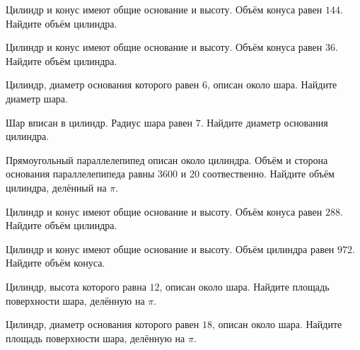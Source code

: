 \documentclass[4apaper]{article}
\begin{document}
\begin{taskBN}{9}
Цилиндр и конус имеют общие основание и высоту. Объём конуса равен $144$. Найдите объём цилиндра.
\end{taskBN}

\begin{taskBN}{10}
Цилиндр и конус имеют общие основание и высоту. Объём конуса равен $36$. Найдите объём цилиндра.
\end{taskBN}

\begin{taskBN}{11}
 Цилиндр, диаметр основания которого равен $6$, описан около шара. Найдите диаметр шара.
\end{taskBN}

\begin{taskBN}{12}
Шар вписан в цилиндр. Радиус шара равен $7$. Найдите диаметр основания цилиндра.
\end{taskBN}

\begin{taskBN}{13}
Прямоугольный параллелепипед описан около цилиндра. Объём и сторона основания параллелепипеда равны $3600$ и $20$ соотвественно. Найдите объём цилиндра, делённый на $\pi$.
\end{taskBN}

\begin{taskBN}{14}
Цилиндр и конус имеют общие основание и высоту. Объём конуса равен $288$. Найдите объём цилиндра.
\end{taskBN}

\begin{taskBN}{15}
Цилиндр и конус имеют общие основание и высоту. Объём цилиндра равен $972$. Найдите объём конуса.
\end{taskBN}

\begin{taskBN}{16}
 Цилиндр, высота которого равна $12$, описан около шара. Найдите площадь поверхности шара, делённую на $\pi$.
\end{taskBN}

\begin{taskBN}{17}
 Цилиндр, диаметр основания которого равен $18$, описан около шара. Найдите площадь поверхности шара, делённую на $\pi$.
\end{taskBN}
\end{document}
